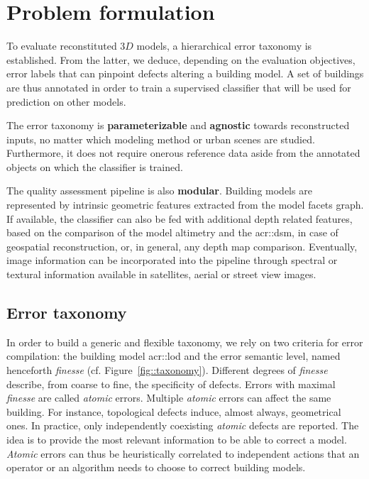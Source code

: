 \documentclass[runningheads]{llncs}
\begin{document}
\section{Problem formulation}
\label{sec:approach}
To evaluate reconstituted $3D$ models, a hierarchical error taxonomy is established. From the latter, we deduce, depending on the evaluation objectives,
error labels that can pinpoint defects altering a building model. A set of buildings are thus annotated in order to train a supervised classifier that will be used for prediction on other models.

The error taxonomy is \textbf{parameterizable} and \textbf{agnostic} towards reconstructed inputs, no matter which modeling method or urban scenes are studied. Furthermore, it does not require onerous reference data aside from the annotated objects on which the classifier is trained.

The quality assessment pipeline is also \textbf{modular}. Building models are represented by intrinsic geometric features extracted from the model facets graph. If available, the classifier can also be fed with additional depth related features, based on the comparison of the model altimetry and the \acrshort{acr::dsm}, in case of geospatial reconstruction, or, in general, any depth map comparison. Eventually, image information can be incorporated into the pipeline through spectral or textural information available in satellites, aerial or street view images.

\subsection{Error taxonomy}
In order to build a generic and flexible taxonomy, we rely on two criteria for error compilation: the building model \acrshort{acr::lod} and the error semantic level, named henceforth \textit{finesse} (cf. Figure~\ref{fig::taxonomy}). Different degrees of \textit{finesse} describe, from coarse to fine, the specificity of defects. Errors with maximal \textit{finesse} are called \textit{atomic} errors. Multiple \textit{atomic} errors can affect the same building. For instance, topological defects induce, almost always, geometrical ones. In practice, only independently coexisting \textit{atomic} defects are reported. The idea is to provide the most relevant information to be able to correct a model. \textit{Atomic} errors can thus be heuristically correlated to independent actions that an operator or an algorithm needs to choose to correct building models.
\end{document}
